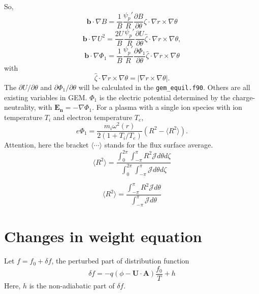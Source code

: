 \documentclass[12pt]{article}
\begin{document}
\begin{CJK*}{UTF8}{gbsn}
So,
\begin{equation}
    \mathbf{b}\cdot\nabla B=\frac{1}{B}\frac{\psi_p'}{R}\frac{\partial B}{\partial \theta}\hat{\zeta}\cdot\nabla r \times \nabla\theta
\end{equation}
\begin{equation}
    \mathbf{b}\cdot\nabla U^2=\frac{2U}{B}\frac{\psi_p'}{R}\frac{\partial U}{\partial \theta}\hat{\zeta}\cdot\nabla r \times \nabla\theta,
\end{equation}
\begin{equation}
    \mathbf{b}\cdot\nabla \Phi_1=\frac{1}{B}\frac{\psi_p'}{R}\frac{\partial \Phi_1}{\partial \theta}\hat{\zeta}\cdot\nabla r \times \nabla\theta
\end{equation}
with
\begin{equation}
    \hat{\zeta}\cdot\nabla r \times \nabla\theta = |\nabla r \times \nabla\theta|.
\end{equation}
The $\partial U/\partial\theta$ and $\partial \Phi_1/\partial\theta$ will be calculated in the \texttt{gem\_equil.f90}. Others are all existing variables in GEM. 
$\Phi_1$ is the electric potential determined by the charge-neutrality, with $\mathbf{E_n}=-\nabla\Phi_1$. For a plasma with a single ion species with ion 
temperature $T_i$ and electron temperature $T_e$, 
\begin{equation}
    e\Phi_1=\frac{m_i\omega^2(r)}{2(1+T_i/T_e)}(R^2 - \langle R^2\rangle).
\end{equation}
Attention, here the bracket $\langle\cdots\rangle$ stands for the flux surface average.
\begin{equation}
    \langle R^2 \rangle=\frac{\int_{0}^{2 \pi} \int_{-\pi}^{\pi} R^2 \mathcal{J} d \theta d \zeta}{\int_{0}^{2 \pi} \int_{-\pi}^{\pi} \mathcal{J} d \theta d \zeta}
\end{equation}

\begin{equation}
    \langle R^2 \rangle=\frac{\int_{-\pi}^{\pi} R^2 \mathcal{J} d \theta}{\int_{-\pi}^{\pi} \mathcal{J} d \theta}
\end{equation}

 


\newpage
\section{Changes in weight equation} 
Let $f=f_0+\delta f$, the perturbed part of distribution function
\begin{equation}
    \delta f = -q(\phi - \mathbf{U\cdot A})\frac{f_0}{T} + h
\end{equation}
Here, $h$ is the non-adiabatic part of $\delta f$. 


\end{CJK*}
\end{document}
